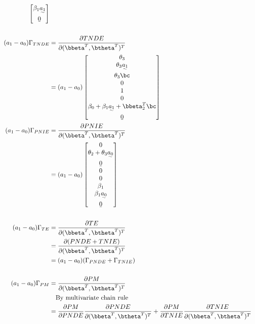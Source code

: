 \documentclass[10pt]{article}
\begin{document}
\begin{align*}
\begin{bmatrix}
      \beta_{1}\uwave{a_{1}}\\
      \b0\\
    \end{bmatrix}\\
  \\
  (a_{1}-a_{0})\Gamma_{TNDE}
  &= \frac{\partial TNDE}{\partial (\bbeta^{T},\btheta^{T})^{T}}\\
  &= (a_{1}-a_{0})
    \begin{bmatrix}
      \theta_{3}\\
      \theta_{3}\uwave{a_{1}}\\
      \theta_{3}\bc\\
      0\\
      1\\
      0\\
      \beta_{0} + \beta_{1}\uwave{a_{1}} + \bbeta_{2}^{T}\bc\\
      \b0\\
    \end{bmatrix}\\
  (a_{1}-a_{0})\Gamma_{PNIE}
  &= \frac{\partial PNIE}{\partial (\bbeta^{T},\btheta^{T})^{T}}\\
  &= (a_{1}-a_{0})
    \begin{bmatrix}
      0\\
      \theta_{2} + \theta_{3}\uwave{a_{0}}\\
      \b0\\
      0\\
      0\\
      \beta_{1}\\
      \beta_{1}\uwave{a_{0}}\\
      \b0\\
    \end{bmatrix}\\
  \\
  (a_{1}-a_{0})\Gamma_{TE}
  &= \frac{\partial TE}{\partial (\bbeta^{T},\btheta^{T})^{T}}\\
  &= \frac{\partial (PNDE+TNIE)}{\partial (\bbeta^{T},\btheta^{T})^{T}}\\
  &= (a_{1}-a_{0})(\Gamma_{PNDE} + \Gamma_{TNIE})\\
  \\
  (a_{1}-a_{0})\Gamma_{PM}
  &= \frac{\partial PM}{\partial (\bbeta^{T},\btheta^{T})^{T}}\\
  &~~~\text{By multivariate chain rule}\\
  &= \frac{\partial PM}{\partial PNDE}\frac{\partial PNDE}{\partial (\bbeta^{T},\btheta^{T})^{T}} + \frac{\partial PM}{\partial TNIE}\frac{\partial TNIE}{\partial (\bbeta^{T},\btheta^{T})^{T}}\\

\end{align*}
\end{document}
